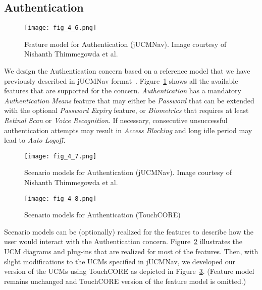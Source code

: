 \subsection{Authentication}

\begin{figure}[h]
	\centering
	\texttt{[image: fig\_4\_6.png]}
	\caption[Feature model for Authentication (jUCMNav)]{Feature model for Authentication (jUCMNav). Image courtesy of Nishanth Thimmegowda et al.~\cite{thimmegowda2014concern}}
	\label{fig:4.6}
\end{figure}

We design the Authentication concern based on a reference model that we have previously described in jUCMNav format~\cite{thimmegowda2014concern}. Figure~\ref{fig:4.6} shows all the available features that are supported for the concern. \emph{Authentication} has a mandatory \emph{Authentication Means} feature that may either be \emph{Password} that can be extended with the optional \emph{Password Expiry} feature, or \emph{Biometrics} that requires at least \emph{Retinal Scan} or \emph{Voice Recognition}. If necessary, consecutive unsuccessful authentication attempts may result in \emph{Access Blocking} and long idle period may lead to \emph{Auto Logoff}.

\begin{figure}
	\centering
	\texttt{[image: fig\_4\_7.png]}
	\caption[Scenario models for Authentication (jUCMNav)]{Scenario models for Authentication (jUCMNav). Image courtesy of Nishanth Thimmegowda et al.~\cite{thimmegowda2014concern}}
	\label{fig:4.7}
\end{figure}

\begin{figure}
	\centering
	\texttt{[image: fig\_4\_8.png]}
	\caption{Scenario models for Authentication (TouchCORE)}
	\label{fig:4.8}
\end{figure}

Scenario models can be (optionally) realized for the features to describe how the user would interact with the Authentication concern. Figure~\ref{fig:4.7} illustrates the UCM diagrams and plug-ins that are realized for most of the features. Then, with slight modifications to the UCMs specified in jUCMNav, we developed our version of the UCMs using TouchCORE as depicted in Figure~\ref{fig:4.8}. (Feature model remains unchanged and TouchCORE version of the feature model is omitted.)

